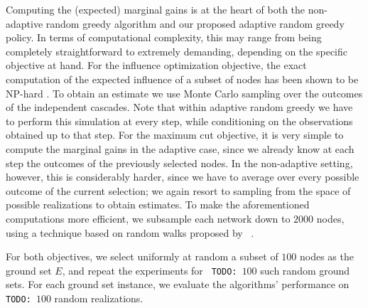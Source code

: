 \documentclass{article}
\newcommand{\todo}[1]{\noindent\texttt{\small\color[rgb]{0.5,0.1,0.1} TODO: #1}}
\newcommand{\citet}[1]{\citeauthor{#1}~\shortcite{#1}}
\begin{document}
Computing the (expected) marginal gains is at the heart of both the non-adaptive random greedy algorithm and our proposed adaptive random greedy policy.
In terms of computational complexity, this may range from being completely straightforward to extremely demanding, depending on the specific objective at hand.
For the influence optimization objective, the exact computation of the expected influence of a subset of nodes has been shown to be NP-hard \cite{kempe03}.
To obtain an estimate we use Monte Carlo sampling over the outcomes of the independent cascades.
Note that within adaptive random greedy we have to perform this simulation at every step, while conditioning on the observations obtained up to that step.
For the maximum cut objective, it is very simple to compute the marginal gains in the adaptive case, since we already know at each step the outcomes of the previously selected nodes.
In the non-adaptive setting, however, this is considerably harder, since we have to average over every possible outcome of the current selection; we again resort to sampling from the space of possible realizations to obtain estimates.
To make the aforementioned computations more efficient, we subsample each network down to $2000$ nodes, using a technique based on random walks proposed by \citet{leskovec06}.

For both objectives, we select uniformly at random a subset of $100$ nodes as the ground set $E$, and repeat the experiments for \todo{$100$} such random ground sets.
For each ground set instance, we evaluate the algorithms' performance on \todo{$100$} random realizations.
\end{document}
